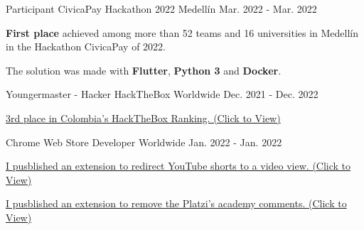 
\begin{cventries}
  \cventry
  {Participant} %
  {CivicaPay Hackathon 2022} %
  {Medellín} %
  {Mar. 2022 - Mar. 2022} %
  {
    \begin{cvitems} %
      \item {\textbf{First place} achieved among more than 52 teams and 16 universities in
                  Medellín in the Hackathon CivicaPay of 2022.}
      \item {The solution was made with \textbf{Flutter}, \textbf{Python 3} and \textbf{Docker}.}
    \end{cvitems}
  }

  \cventry
  {Youngermaster - Hacker} %
  {HackTheBox} %
  {Worldwide} %
  {Dec. 2021 - Dec. 2022} %
  {
    \begin{cvitems} %
      \item {\href{https://app.hackthebox.com/profile/643960}{3rd place in Colombia's HackTheBox Ranking. (Click to View)}}
    \end{cvitems}
  }

  \cventry
  {Chrome Web Store} %
  {Developer} %
  {Worldwide} %
  {Jan. 2022 - Jan. 2022} %
  {
    \begin{cvitems} %
      \item {\href{https://chrome.google.com/webstore/detail/youtube-short-redirector/mnijpcchboaebolejillacjcmngnhppg}
                  {I pusblished an extension to redirect YouTube shorts to a video view. (Click to View)}}
      \item {\href{https://chrome.google.com/webstore/detail/platzi-community-wrapper/dakgbbfpefoofghfbkopnbnpadeblbep}
                  {I pusblished an extension to remove the Platzi's academy comments. (Click to View)}}
    \end{cvitems}
  }


\end{cventries}
